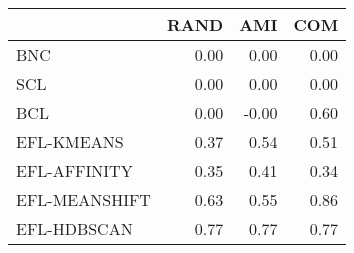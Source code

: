 \begin{tabular}{lrrr}
\toprule
 & RAND & AMI & COM \\
\midrule
BNC & 0.00 & 0.00 & 0.00 \\
SCL & 0.00 & 0.00 & 0.00 \\
BCL & 0.00 & -0.00 & 0.60 \\
EFL-KMEANS & 0.37 & 0.54 & 0.51 \\
EFL-AFFINITY & 0.35 & 0.41 & 0.34 \\
EFL-MEANSHIFT & 0.63 & 0.55 & 0.86 \\
EFL-HDBSCAN & 0.77 & 0.77 & 0.77 \\
\bottomrule
\end{tabular}
